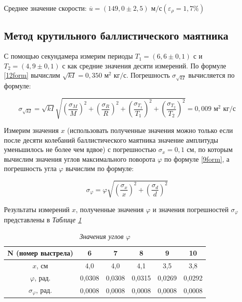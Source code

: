 \documentclass[a4paper,12pt]{article} %
\begin{document}
Среднее значение скорости: $\overline{u} = \left( 149,0 \pm 2,5 \right) \text{ м/с} \left( \varepsilon_\rho = 1,7 \% \right)$\\

\subsection{Метод крутильного баллистического маятника}

С помощью секундамера измерим периоды $T_1 = \left( 6,6 \pm 0,1 \right) \text{ с}$ и $T_2 = \left( 4,9 \pm 0,1 \right) \text{ с}$ как средние значения десяти измерений. По формуле \eqref{12form} вычислим $\sqrt{kI} = 0,350 \text{ м}^2 \text{ кг}/\text{с}$. Погрешность $\sigma_{\sqrt{kI}}$ вычисляется по формуле:

\begin{equation}
    \sigma_{\sqrt{kI}} = \sqrt{kI} \sqrt{ \left( \frac{\sigma_M}{M} \right)^2 + \left( \frac{\sigma_R}{R} \right)^2 + \left( \frac{\sigma_{T_1}}{T_1} \right)^2 + \left( \frac{\sigma_{T_2}}{T_2} \right)^2} = 0,009 \text{ м}^2 \text{ кг}/\text{с}
\end{equation}

Измерим значения $x$ (использовать полученные значения можно только если после десяти колебаний баллистического маятника значение амплитуды уменьшилось не более чем вдвое) с погрешностью $\sigma_x = 0,1 \text{ см}$, по которым вычислим значения углов максимального поворота $\varphi$ по формуле \eqref{9form}, а погрешность угла $\varphi$ вычислим по формуле:

\begin{equation}
    \sigma_\varphi = \varphi \sqrt{ \left( \frac{\sigma_x}{x} \right)^2 + \left( \frac{\sigma_d}{d} \right)^2}
\end{equation}

Результаты измерений $x$, полученные значения $\varphi$ и значения погрешностей $\sigma_\varphi$ представлены в \textit{Таблице \ref{tab:tab-phi}}

\begin{table}[!ht]
    \centering
    \begin{tabular}{|c|c|c|c|c|c|}
    \hline
        N (номер выстрела) & 6 & 7 & 8 & 9 & 10 \\ \hline
        $x$, см & 4,0 & 4,0 & 4,1 & 3,5 & 3,8 \\ \hline
        $\varphi$, рад. & 0,0308 & 0,0308 & 0,0315 & 0,0269 & 0,0292 \\ \hline
        $\sigma_\varphi$, рад. & 0,0008 & 0,0008 & 0,0008 & 0,0008 & 0,0008 \\ \hline
    \end{tabular}
    \caption{\textit{Значения углов $\varphi$}}
    \label{tab:tab-phi}
\end{table}
\end{document}

